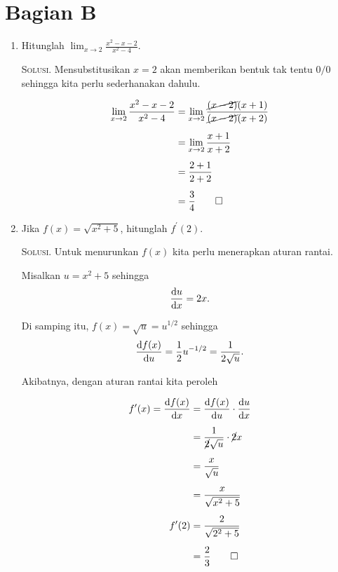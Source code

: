 \documentclass{exam}
\newcounter{hitung}
\renewenvironment{proof}[1][Solusi.]{\ProofBox\strut\textsc{#1}\space}{\endProofBox}
\numberwithin{equation}{section}
\begin{document}
\section*{Bagian B}
\begin{enumerate}
    \item Hitunglah $\displaystyle \lim_{x \to 2} \frac{x^2 - x - 2}{x^2 - 4}$.
    
    \begin{proof}
        Mensubstitusikan $x = 2$ akan memberikan bentuk tak tentu $0/0$ sehingga kita perlu sederhanakan dahulu.
        
        \vspace{-2em}
        \begin{align*}
            \lim_{x \to 2} \frac{x^2 - x - 2}{x^2 - 4}  &= \lim_{x \to 2} \frac{\cancel{(x - 2)}(x + 1)}{\cancel{(x - 2)}(x + 2)} \\[.5em]
                                                        &= \lim_{x \to 2} \frac{x + 1}{x + 2}   \\[.5em]
                                                        &= \frac{2 + 1}{2 + 2}                  \\[.5em]
                                                        &= \frac{3}{4} \qed
        \end{align*}
    \end{proof}\vspace{1em}
    
    \item Jika $f(x) = \sqrt{x^2 + 5}$, hitunglah $f^\prime(2)$.
    
    \begin{proof}
        Untuk menurunkan $f(x)$ kita perlu menerapkan aturan rantai.
        \par Misalkan $u = x^2 + 5$ sehingga $$ \dv{u}{x} = 2x.$$ 
        \par Di samping itu, $f(x) = \sqrt{u} = u^{1/2}$ sehingga $$ \dv{f(x)}{u} = \frac{1}{2}u^{-1/2} = \frac{1}{2\sqrt{u}}.$$
        \par Akibatnya, dengan aturan rantai kita peroleh

        \vspace{-1em}
        \begin{align*}
            f^\prime(x) = \dv{f(x)}{x}  &= \dv{f(x)}{u} \cdot \dv{u}{x} \\[.5em]
                                        &= \frac{1}{\cancel{2}\sqrt{u}} \cdot \cancel{2}x \\[.5em]
                                        &= \frac{x}{\sqrt{u}}           \\[.5em]
                                        &= \frac{x}{\sqrt{x^2 + 5}}            \\[.5em]
                            f^\prime(2) &= \frac{2}{\sqrt{2^2 + 5}}            \\[.5em]
                                        &= \frac{2}{3} \qed
        \end{align*}
    \end{proof}\vspace{1em}


\end{enumerate}
\end{document}

